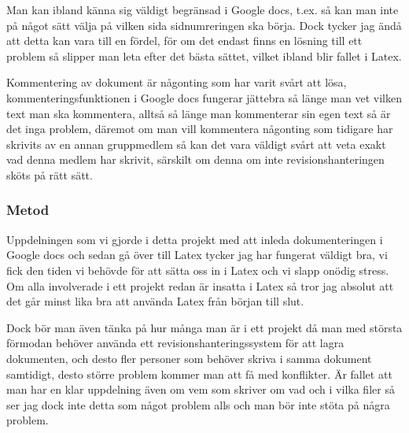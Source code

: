 Man kan ibland känna sig väldigt begränsad i Google docs, t.ex. så kan man inte på något sätt välja på vilken sida sidnumreringen ska börja. Dock tycker jag ändå att detta kan vara till en fördel, för om det endast finns en lösning till ett problem så slipper man leta efter det bästa sättet, vilket ibland blir fallet i Latex.



Kommentering av dokument är någonting som har varit svårt att lösa, kommenteringsfunktionen i Google docs fungerar jättebra så länge man vet vilken text man ska kommentera, alltså så länge man kommenterar sin egen text så är det inga problem, däremot om man vill kommentera någonting som tidigare har skrivits av en annan gruppmedlem så kan det vara väldigt svårt att veta exakt vad denna medlem har skrivit, särskilt om denna om inte revisionshanteringen sköts på rätt sätt.



\subsubsection{Metod}
Uppdelningen som vi gjorde i detta projekt med att inleda dokumenteringen i Google docs och sedan gå över till Latex tycker jag har fungerat väldigt bra, vi fick den tiden vi behövde för att sätta oss in i Latex och vi slapp onödig stress. Om alla involverade i ett projekt redan är insatta i Latex så tror jag absolut att det går minst lika bra att använda Latex från början till slut.

Dock bör man även tänka på hur många man är i ett projekt då man med största förmodan behöver använda ett revisionshanteringssystem för att lagra dokumenten, och desto fler personer som behöver skriva i samma dokument samtidigt, desto större problem kommer man att få med konflikter. Är fallet att man har en klar uppdelning även om vem som skriver om vad och i vilka filer så ser jag dock inte detta som något problem alls och man bör inte stöta på några problem.

